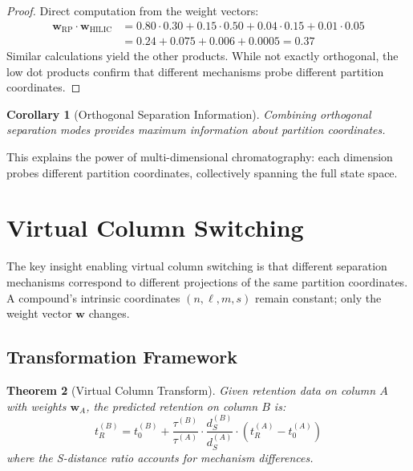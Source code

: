 \documentclass[twocolumn,10pt]{article}
\newtheorem{theorem}{Theorem}[section]
\newtheorem{corollary}[theorem]{Corollary}
\begin{document}
\begin{proof}
Direct computation from the weight vectors:
\begin{align}
\mathbf{w}_{\text{RP}} \cdot \mathbf{w}_{\text{HILIC}} &= 0.80 \cdot 0.30 + 0.15 \cdot 0.50 + 0.04 \cdot 0.15 + 0.01 \cdot 0.05 \\
&= 0.24 + 0.075 + 0.006 + 0.0005 = 0.37
\end{align}
Similar calculations yield the other products. While not exactly orthogonal, the low dot products confirm that different mechanisms probe different partition coordinates.
\end{proof}

\begin{corollary}[Orthogonal Separation Information]
\label{cor:orthogonal}
Combining orthogonal separation modes provides maximum information about partition coordinates.
\end{corollary}

This explains the power of multi-dimensional chromatography: each dimension probes different partition coordinates, collectively spanning the full state space.

\section{Virtual Column Switching}
\label{sec:virtual}

The key insight enabling virtual column switching is that different separation mechanisms correspond to different projections of the same partition coordinates. A compound's intrinsic coordinates $(n, \ell, m, s)$ remain constant; only the weight vector $\mathbf{w}$ changes.

\subsection{Transformation Framework}

\begin{theorem}[Virtual Column Transform]
\label{thm:virtual}
Given retention data on column $A$ with weights $\mathbf{w}_A$, the predicted retention on column $B$ is:
\begin{equation}
t_R^{(B)} = t_0^{(B)} + \frac{\tau^{(B)}}{\tau^{(A)}} \cdot \frac{d_S^{(B)}}{d_S^{(A)}} \cdot (t_R^{(A)} - t_0^{(A)})
\end{equation}
where the S-distance ratio accounts for mechanism differences.
\end{theorem}
\end{document}
